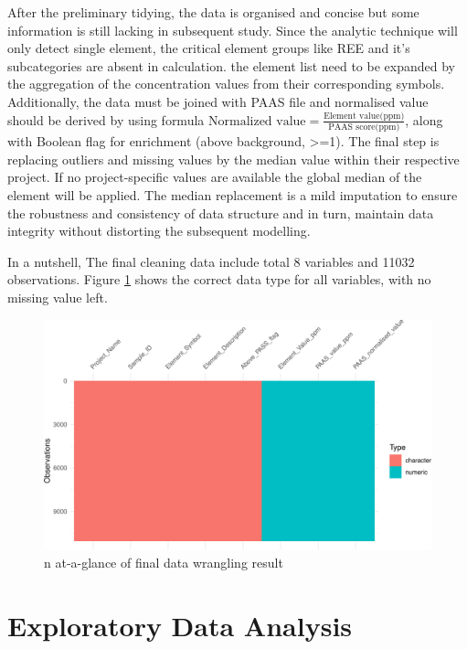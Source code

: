 \documentclass[11pt,a4paper,]{article}
\begin{document}
After the preliminary tidying, the data is organised and concise but some information is still lacking in subsequent study. Since the analytic technique will only detect single element, the critical element groups like REE and it's subcategories are absent in calculation. the element list need to be expanded by the aggregation of the concentration values from their corresponding symbols. Additionally, the data must be joined with PAAS file and normalised value should be derived by using formula \(\text{Normalized value}= \frac{\text{Element value(ppm)}}{\text{PAAS score(ppm)}}\), along with Boolean flag for enrichment (above background, \textgreater=1). The final step is replacing outliers and missing values by the median value within their respective project. If no project-specific values are available the global median of the element will be applied. The median replacement is a mild imputation to ensure the robustness and consistency of data structure and in turn, maintain data integrity without distorting the subsequent modelling.

In a nutshell, The final cleaning data include total 8 variables and 11032 observations. Figure \ref{fig:visdat} shows the correct data type for all variables, with no missing value left.

\begin{figure}
\centering
\includegraphics{Final_report_files/figure-latex/visdat-1.pdf}
\caption{\label{fig:visdat}n at-a-glance of final data wrangling result}
\end{figure}

\section{Exploratory Data Analysis}\label{exploratory-data-analysis}
\end{document}

